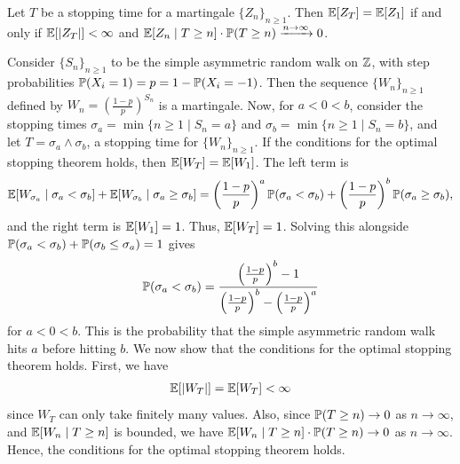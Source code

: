\begin{theorem}
    Let $T$ be a stopping time for a martingale $\{Z_{n}\}_{n \geq 1}$. Then $\mathbb{E}[Z_{T}] = \mathbb{E}[Z_{1}]$ if and only if $\mathbb{E}[\left| Z_{T} \right|] < \infty$ and $\mathbb{E}[Z_{n} \mid T \geq n] \cdot \mathbb{P}(T \geq n) \xrightarrow{n \to \infty} 0$.
\end{theorem}

\begin{example}
    Consider $\{S_{n}\}_{n \geq 1}$ to be the simple asymmetric random walk on $\mathbb{Z}$, with step probabilities $\mathbb{P}(X_{i}=1) = p = 1-\mathbb{P}(X_{i}=-1)$. Then the sequence $\{W_{n}\}_{n \geq 1}$ defined by $W_{n} = \left( \frac{1-p}{p} \right)^{S_{n}}$ is a martingale. Now, for $a < 0 < b$, consider the stopping times $\sigma_{a} = \min\{n \geq 1 \mid S_{n}=a\}$ and $\sigma_{b} = \min\{n \geq 1 \mid S_{n}=b\}$, and let $T = \sigma_{a} \wedge \sigma_{b}$, a stopping time for $\{W_{n}\}_{n \geq 1}$. If the conditions for the optimal stopping theorem holds, then $\mathbb{E}[W_{T}] = \mathbb{E}[W_{1}]$. The left term is
    \begin{align}
        \mathbb{E}[W_{\sigma_{a}} \mid \sigma_{a} < \sigma_{b}] + \mathbb{E}[W_{\sigma_{b}} \mid \sigma_{a} \geq \sigma_{b}] = \left( \frac{1-p}{p} \right)^{a} \mathbb{P}(\sigma_{a} < \sigma_{b}) + \left( \frac{1-p}{p} \right)^{b} \mathbb{P}(\sigma_{a} \geq \sigma_{b}),
    \end{align}
    and the right term is $\mathbb{E}[W_{1}] = 1$. Thus, $\mathbb{E}[W_{T}] = 1$. Solving this alongside $\mathbb{P}(\sigma_{a} < \sigma_{b}) + \mathbb{P}(\sigma_{b} \leq \sigma_{a}) = 1$ gives
    \begin{align}
        \mathbb{P}(\sigma_{a} < \sigma_{b}) = \dfrac{\left( \frac{1-p}{p} \right)^{b} - 1}{\left( \frac{1-p}{p} \right)^{b} - \left( \frac{1-p}{p} \right)^{a}}
    \end{align}
    for $a < 0 < b$. This is the probability that the simple asymmetric random walk hits $a$ before hitting $b$. We now show that the conditions for the optimal stopping theorem holds. First, we have
    \begin{align}
        \mathbb{E}[\left| W_{T} \right|] = \mathbb{E}[W_{T}] < \infty
    \end{align}
    since $W_{T}$ can only take finitely many values. Also, since $\mathbb{P}(T \geq n) \to 0$ as $n \to \infty$, and $\mathbb{E}[W_{n} \mid T \geq n]$ is bounded, we have $\mathbb{E}[W_{n} \mid T \geq n] \cdot \mathbb{P}(T \geq n) \to 0$ as $n \to \infty$. Hence, the conditions for the optimal stopping theorem holds.
\end{example}

